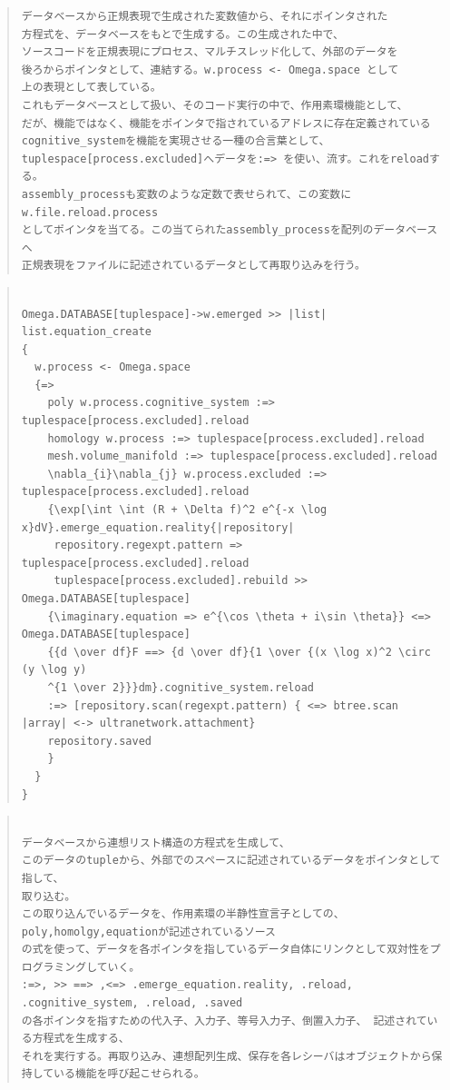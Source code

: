 \documentclass{jsarticle}
\begin{document}
\begin{quote}
\setlength{\baselineskip}{12pt}
\begin{verbatim}
データベースから正規表現で生成された変数値から、それにポインタされた
方程式を、データベースをもとで生成する。この生成された中で、
ソースコードを正規表現にプロセス、マルチスレッド化して、外部のデータを
後ろからポインタとして、連結する。w.process <- Omega.space として
上の表現として表している。
これもデータベースとして扱い、そのコード実行の中で、作用素環機能として、
だが、機能ではなく、機能をポインタで指されているアドレスに存在定義されている
cognitive_systemを機能を実現させる一種の合言葉として、
tuplespace[process.excluded]へデータを:=> を使い、流す。これをreloadする。
assembly_processも変数のような定数で表せられて、この変数にw.file.reload.process
としてポインタを当てる。この当てられたassembly_processを配列のデータベースへ
正規表現をファイルに記述されているデータとして再取り込みを行う。
\end{verbatim}
\end{quote}
\begin{quote}
\setlength{\baselineskip}{12pt}
\begin{verbatim}

Omega.DATABASE[tuplespace]->w.emerged >> |list| list.equation_create
{
  w.process <- Omega.space
  {=>
    poly w.process.cognitive_system :=> tuplespace[process.excluded].reload
    homology w.process :=> tuplespace[process.excluded].reload
    mesh.volume_manifold :=> tuplespace[process.excluded].reload
    \nabla_{i}\nabla_{j} w.process.excluded :=> tuplespace[process.excluded].reload
    {\exp[\int \int (R + \Delta f)^2 e^{-x \log x}dV}.emerge_equation.reality{|repository|
     repository.regexpt.pattern => tuplespace[process.excluded].reload
     tuplespace[process.excluded].rebuild >> Omega.DATABASE[tuplespace]
    {\imaginary.equation => e^{\cos \theta + i\sin \theta}} <=> Omega.DATABASE[tuplespace]
    {{d \over df}F ==> {d \over df}{1 \over {(x \log x)^2 \circ (y \log y)
    ^{1 \over 2}}}dm}.cognitive_system.reload 
    :=> [repository.scan(regexpt.pattern) { <=> btree.scan |array| <-> ultranetwork.attachment}
    repository.saved
    }
  }
}
\end{verbatim}
\end{quote}

\begin{quote}
\setlength{\baselineskip}{12pt}
\begin{verbatim}

データベースから連想リスト構造の方程式を生成して、
このデータのtupleから、外部でのスペースに記述されているデータをポインタとして指して、
取り込む。
この取り込んでいるデータを、作用素環の半静性宣言子としての、poly,homolgy,equationが記述されているソース
の式を使って、データを各ポインタを指しているデータ自体にリンクとして双対性をプログラミングしていく。
:=>, >> ==> ,<=> .emerge_equation.reality, .reload, .cognitive_system, .reload, .saved
の各ポインタを指すための代入子、入力子、等号入力子、倒置入力子、 記述されている方程式を生成する、
それを実行する。再取り込み、連想配列生成、保存を各レシーバはオブジェクトから保持している機能を呼び起こせられる。
 \end{verbatim}
\end{quote}
\end{document}
